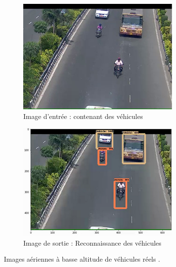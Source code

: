 \begin{figure}[H]
    \centering
    \begin{subfigure}[b]{0.45\textwidth}
        \centering
        \includegraphics[width=\textwidth]{./images/input-image.png}
        \caption{Image d'entrée : contenant des véhicules}
    \end{subfigure}
    \hfill
    \begin{subfigure}[b]{0.45\textwidth}
        \centering
        \includegraphics[width=\textwidth]{./images/output-image.png}
        \caption{Image de sortie : Reconnaissance des véhicules}
    \end{subfigure}
    \caption{Images aériennes à basse altitude de véhicules réels \cite[p.~3]{kamran2020}.}
    \label{fig:inptu-Output-image}
\end{figure}

